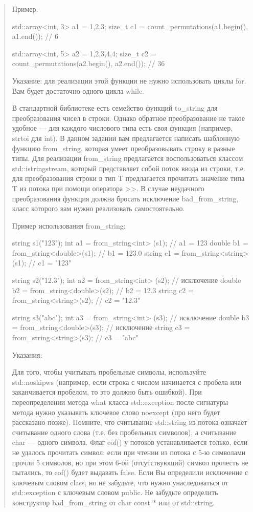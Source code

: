 \documentclass[]{article}
\begin{document}
\begin{quote}
Пример:

std::array<int, 3> a1 = {1,2,3};
size_t c1 = count_permutations(a1.begin(), a1.end()); // 6

std::array<int, 5> a2 = {1,2,3,4,4};
size_t c2 = count_permutations(a2.begin(), a2.end()); // 36


Указание: для реализации этой функции не нужно использовать циклы for. Вам будет достаточно одного цикла while.



В стандартной библиотеке есть семейство функций to_string для преобразования чисел в строки. Однако обратное преобразование не такое удобное — для каждого числового типа есть своя функция (например, strtoi для int).
В данном задании вам предлагается написать шаблонную функцию from_string, которая умеет преобразовывать строку в разные типы. Для реализации from_string предлагается воспользоваться классом std::istringstream, который представляет собой поток ввода из строки, т.е. для преобразования строки в тип T предлагается прочитать значение типа T из потока при помощи оператора >>. В случае неудачного преобразования функция должна бросать исключение bad_from_string, класс которого вам нужно реализовать самостоятельно.

Пример использования from_string:

string s1("123");
int    a1 = from_string<int>   (s1); // a1 = 123
double b1 = from_string<double>(s1); // b1 = 123.0
string c1 = from_string<string>(s1); // c1 = "123"

string s2("12.3");
int    a2 = from_string<int>   (s2); // исключение
double b2 = from_string<double>(s2); // b2 = 12.3
string c2 = from_string<string>(s2); // c2 = "12.3"

string s3("abc");
int    a3 = from_string<int>   (s3); // исключение
double b3 = from_string<double>(s3); // исключение
string c3 = from_string<string>(s3); // c3 = "abc"


Указания:

    Для того, чтобы учитывать пробельные символы, используйте std::noskipws (например, если строка с числом начинается с пробела или заканчивается пробелом, то это должно быть ошибкой).
    При переопределении метода what класса std::exception после сигнатуры метода нужно указывать ключевое слово noexcept (про него будет рассказано позже).
    Помните, что считывание std::string из потока означает считывание одного слова (т.е. без пробельных символов), а считывание char — одного символа.
    Флаг eof() у потоков устанавливается только, если не удалось прочитать символ: если при чтении из потока с 5-ю символами прочли 5 символов, но при этом 6-ой (отсутствующий) символ прочесть не пытались, то eof() будет выдавать false.
    Если Вы определили исключение с ключевым словом class, но не забудьте, что нужно унаследоваться от std::exception с ключевым словом public.
    Не забудьте определить конструктор bad_from_string от char const * или от std::string.




\end{quote}
\end{document}
